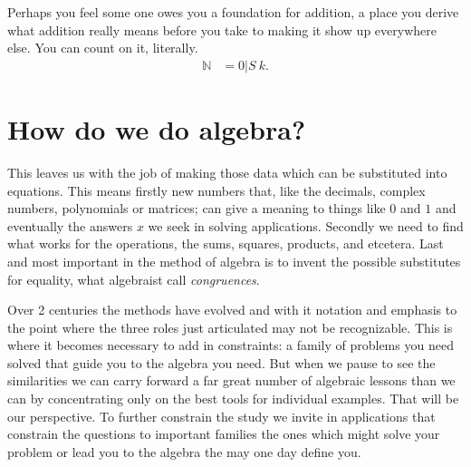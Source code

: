 Perhaps you feel some one owes you a foundation for addition, 
a place you derive what addition really means before you 
take to making it show up everywhere else.
You can count on it, literally.
\begin{align*}
    \mathbb{N} & = 0 | S~k.
\end{align*}


\chapter{How do we do algebra?}

This leaves us with the job of making those data which can be substituted 
into equations.  This means firstly new numbers that, like the decimals, complex 
numbers, polynomials or matrices; can give a meaning to things like $0$ and $1$
and eventually the answers $x$ we seek in solving applications.  Secondly 
we need to find what works for the operations, the sums, squares, products, and 
etcetera.  Last and most important in the method of algebra is to invent the possible 
substitutes for equality, what algebraist call \emph{congruences}.  

Over 2 centuries the methods have evolved and with it notation and emphasis to
the point where the three roles just articulated may not be recognizable.  
This is where it becomes necessary to add in constraints: a family of problems 
you need solved that guide you to the algebra you need.  But when we pause to see 
the similarities we can carry forward a far great number of algebraic lessons 
than we can by concentrating only on the best tools for individual examples.
That will be our perspective.  To further constrain the study we invite in 
applications that constrain the questions to important families the ones
which might solve your problem or lead you to the algebra the may one day define you.

